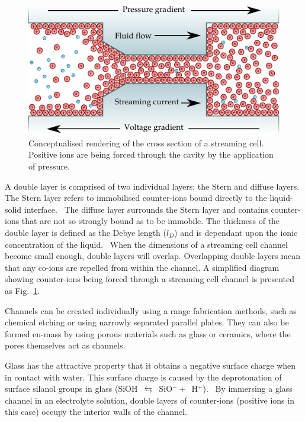 \documentclass[10pt,final,journal]{IEEEtran}
\begin{document}
    \begin{figure}
        \begin{center}
        \includegraphics{diagram_streamingCellPrinciple}
        \end{center}
        \caption{Conceptualised rendering of the cross section of a streaming cell.
        Positive ions are being forced through the cavity by the application of pressure.}
        \label{fig:streamingPrinciple}
    \end{figure}

    A double layer is comprised of two individual layers; the Stern and diffuse layers.
    The Stern layer refers to immobilised counter-ions bound directly to the liquid-solid interface.~\cite{Salieb-Beugelaar2009}
    The diffuse layer surrounds the Stern layer and contains counter-ions that are not so strongly bound as to be immobile.
    The thickness of the double layer is defined as the Debye length ($l_{D}$) and is dependant upon the ionic concentration of the liquid.~\cite{Israelachvili2011}
    When the dimensions of a streaming cell channel become small enough, double layers will overlap.
    Overlapping double layers mean that any co-ions are repelled from within the channel.
    A simplified diagram showing counter-ions being forced through a streaming cell channel is presented as Fig.~\ref{fig:streamingPrinciple}.

    Channels can be created individually using a range fabrication methods, such as chemical etching or using narrowly separated parallel plates.
    They can also be formed en-mass by using porous materials such as glass or ceramics, where the pores themselves act as channels.

    Glass has the attractive property that it obtains a negative surface charge when in contact with water.
    This surface charge is caused by the deprotonation of surface silanol groups in glass (SiOH~$\leftrightarrows$~SiO$^{-}+$~H$^{+}$).~\cite{Kirby2004a}
    By immersing a glass channel in an electrolyte solution, double layers of counter-ions (positive ions in this case) occupy the interior walls of the channel.
\end{document}
